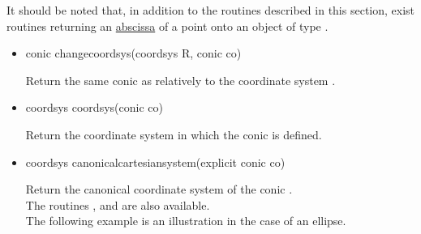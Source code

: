 \documentclass[pdftex]{article}
\begin{document}
It should be noted that, in addition to the routines described in this section,
exist routines returning an \href{#section.abscissa}{abscissa} of a point
onto an object of  type .
\begin{itemize}
\item {}
  \begin{Vcolor}
    conic changecoordsys(coordsys R, conic co)
  \end{Vcolor}
  Return the same conic as  relatively to the coordinate
  system .
\item {}
  \begin{Vcolor}
    coordsys coordsys(conic co)
  \end{Vcolor}
  Return the coordinate system in which the conic  is defined.
\item {}
  \begin{Vcolor}
    coordsys canonicalcartesiansystem(explicit conic co)
  \end{Vcolor}
  Return the canonical coordinate system of the conic .\\
  The routines ,
   and\linebreak
   are also available.\\
  The following example is an illustration in the case of an ellipse.


\end{itemize}
\end{document}
